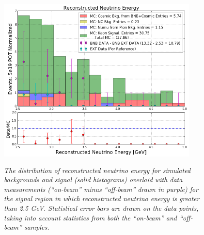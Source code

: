 \begin{figure}[ht!]
\centering
	\includegraphics[width=0.9\textwidth]{Figures/kaon_both_signal.png} \\
\caption{\textit{The distribution of reconstructed neutrino energy for simulated backgrounds and signal (solid histograms) overlaid with data measurements (``on-beam'' minus ``off-beam'' drawn in purple) for the signal region in which reconstructed neutrino energy is greater than 2.5 GeV. Statistical error bars are drawn on the data points, taking into account statistics from both the ``on-beam'' and ``off-beam'' samples.}}\label{kaon_stack_signal_both}
\end{figure}

